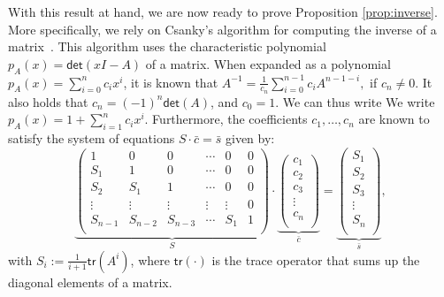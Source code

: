 \medskip 
{}
With this result at hand, we are now ready to prove Proposition \ref{prop:inverse}. More specifically, we rely on Csanky's algorithm for computing the inverse of a matrix~\cite{Csanky76}. This algorithm uses the characteristic polynomial $p_A(x)=\mathsf{det}(xI-A)$ of a matrix. When expanded as a polynomial $p_A(x)=\sum_{i=0}^{n} c_i x^i$, it is known that
$A^{-1}=\frac{1}{c_n}\sum_{i=0}^{n-1}c_i A^{n-1-i},$ if $c_n\neq 0$. It also holds that $c_n=(-1)^n\mathsf{det}(A)$, and   $c_0 = 1$. We can thus write We write $p_A(x)=1 + \sum_{i=1}^n c_ix^i$. Furthermore, the coefficients $c_1,\ldots,c_n$ are known to satisfy the system of equations $S\cdot \bar c=\bar s$ given by:
    $$
    \underbrace{\left(\begin{matrix}
    1 & 0 & 0 & \cdots & 0 & 0\\
    S_1 & 1 & 0 & \cdots  &0 & 0\\
    S_2 & S_1 & 1 & \cdots  &0 & 0\\
    \vdots & \vdots & \vdots & \vdots & \vdots & 0\\
    S_{n-1} & S_{n-2} & S_{n-3} & \cdots & S_1 & 1\\
    \end{matrix}\right)}_{S}\cdot
    \underbrace{\left(\begin{matrix}
    c_1\\
    c_2\\
    c_3\\
    \vdots\\
    c_n\\
    \end{matrix}\right)}_{\bar c}=\underbrace{\left(\begin{matrix}
    S_1\\
    S_2\\
    S_3\\
    \vdots\\
    S_n\\
    \end{matrix}\right)}_{\bar s},
    $$
with $S_i:=\frac{1}{i+1}\mathsf{tr}(A^i)$, where $\mathsf{tr}(\cdot)$ is the trace operator that sums up the diagonal elements of a matrix. 
%
